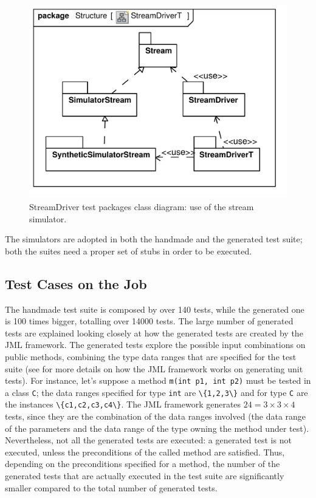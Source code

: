 \documentclass[english]{lni}
\newcommand{\lil}[1]{\texttt{\lstinline|#1|}}
\begin{document}
\begin{figure}[htb!]
  \centering
  \includegraphics[scale=0.4]{UML_model/Class_Diagram__Structure__StreamDriverT}
  \caption{StreamDriver test packages class diagram: use of the stream
    simulator.}
  \label{fig:class_diagram_streamdriver_test}
\end{figure}

The simulators are adopted in both the handmade and the generated test suite; both the suites need a proper set of stubs in order to be executed.



\subsection{Test Cases on the Job}
\label{subsec:test_cases_on_the_job}

The handmade test suite is composed by over 140 tests, while the generated one is 100 times bigger, totalling over 14000 tests.
The large number of generated tests are explained looking closely at how the generated tests are created by the JML framework. 
The generated tests explore the possible input combinations on public methods, combining the type data ranges that are specified for the test suite (see \cite{Cheon-Leavens02} for more details on how the JML framework works on generating unit tests). 
For instance, let's suppose a method \lil{m(int p1, int p2)} must be tested in a class \lil{C}; the data ranges specified for type \lil{int} are \lil{\{1,2,3\}} and for type \lil{C} are the instances \lil{\{c1,c2,c3,c4\}}. 
The JML framework generates $24 = 3 \times 3 \times 4$ tests, since they are the combination of the data ranges involved (the data range of the parameters and the data range of the type owning the method under test). 
Nevertheless, not all the generated tests are executed: a generated test is not executed, unless the preconditions of the called method are satisfied. 
Thus, depending on the preconditions specified for a method, the number of the generated tests that are actually executed in the test suite are significantly smaller compared to the total number of generated tests.
\end{document}
